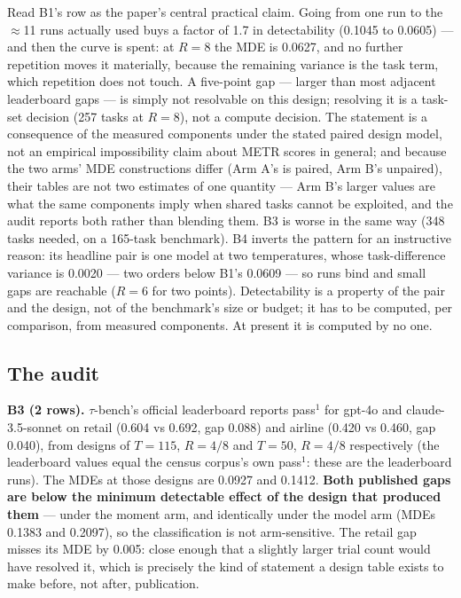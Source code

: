 \documentclass[11pt]{article}
\begin{document}
Read B1's row as the paper's central practical claim. Going from one
run to the $\approx$11 runs actually used buys a factor of 1.7 in
detectability (0.1045 to 0.0605) --- and then the curve is spent: at
$R = 8$ the MDE is 0.0627, and no further repetition moves it
materially, because the remaining variance is the task term, which
repetition does not touch. A five-point gap --- larger than most
adjacent leaderboard gaps --- is simply not resolvable on this design;
resolving it is a task-set decision (257 tasks at $R = 8$), not a
compute decision. The statement is a consequence of the measured
components under the stated paired design model, not an empirical
impossibility claim about METR scores in general; and because the two
arms' MDE constructions differ (Arm A's is paired, Arm B's unpaired),
their tables are not two estimates of one quantity --- Arm B's larger
values are what the same components imply when shared tasks cannot be
exploited, and the audit reports both rather than blending them. B3 is worse in the same way (348 tasks needed, on a
165-task benchmark). B4 inverts the pattern for an instructive reason:
its headline pair is one model at two temperatures, whose
task-difference variance is 0.0020 --- two orders below B1's 0.0609 ---
so runs bind and small gaps are reachable ($R = 6$ for two points).
Detectability is a property of the pair and the design, not of the
benchmark's size or budget; it has to be computed, per comparison, from
measured components. At present it is computed by no one.

\subsection{The audit}

\textbf{B3 (2 rows).} $\tau$-bench's official leaderboard reports
pass$^1$ for gpt-4o and claude-3.5-sonnet on retail (0.604 vs 0.692,
gap 0.088) and airline (0.420 vs 0.460, gap 0.040), from designs of
$T = 115$, $R = 4/8$ and $T = 50$, $R = 4/8$ respectively (the
leaderboard values equal the census corpus's own pass$^1$: these are
the leaderboard runs). The MDEs at those designs are 0.0927 and
0.1412. \textbf{Both published gaps are below the minimum detectable
effect of the design that produced them} --- under the moment arm, and
identically under the model arm (MDEs 0.1383 and 0.2097), so the
classification is not arm-sensitive. The retail gap misses its MDE by
0.005: close enough that a slightly larger trial count would have
resolved it, which is precisely the kind of statement a design table
exists to make before, not after, publication.
\end{document}
